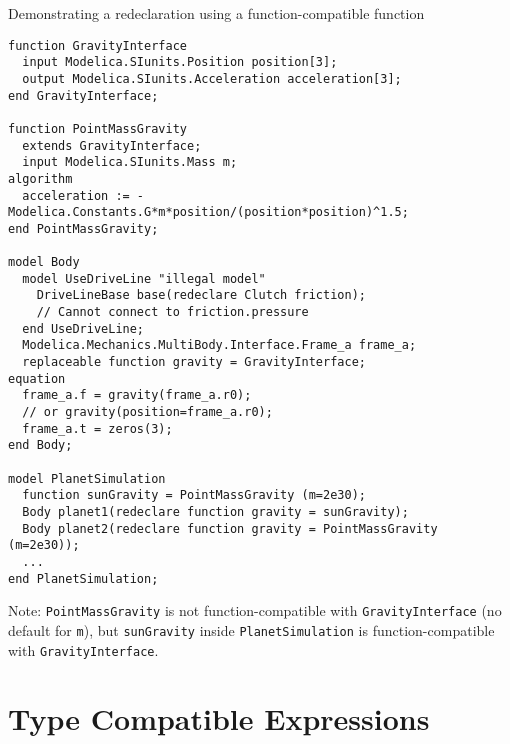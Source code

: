 \begin{example}
Demonstrating a redeclaration using a function-compatible function
\begin{lstlisting}[language=modelica]
function GravityInterface
  input Modelica.SIunits.Position position[3];
  output Modelica.SIunits.Acceleration acceleration[3];
end GravityInterface;

function PointMassGravity
  extends GravityInterface;
  input Modelica.SIunits.Mass m;
algorithm
  acceleration := -Modelica.Constants.G*m*position/(position*position)^1.5;
end PointMassGravity;

model Body
  model UseDriveLine "illegal model"
    DriveLineBase base(redeclare Clutch friction);
    // Cannot connect to friction.pressure
  end UseDriveLine;
  Modelica.Mechanics.MultiBody.Interface.Frame_a frame_a;
  replaceable function gravity = GravityInterface;
equation
  frame_a.f = gravity(frame_a.r0);
  // or gravity(position=frame_a.r0);
  frame_a.t = zeros(3);
end Body;

model PlanetSimulation
  function sunGravity = PointMassGravity (m=2e30);
  Body planet1(redeclare function gravity = sunGravity);
  Body planet2(redeclare function gravity = PointMassGravity (m=2e30));
  ...
end PlanetSimulation;
\end{lstlisting}

Note: \lstinline!PointMassGravity! is not function-compatible with
\lstinline!GravityInterface! (no default for \lstinline!m!), but \lstinline!sunGravity!
inside \lstinline!PlanetSimulation! is function-compatible with
\lstinline!GravityInterface!.
\end{example}

\section{Type Compatible Expressions}

